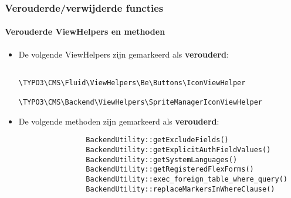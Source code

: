 \begin{frame}[fragile]
	\frametitle{Verouderde/verwijderde functies}
	\framesubtitle{Verouderde ViewHelpers en methoden}


	\begin{itemize}

		\item De volgende ViewHelpers zijn gemarkeerd als \textbf{verouderd}:

			\begin{lstlisting}
				\TYPO3\CMS\Fluid\ViewHelpers\Be\Buttons\IconViewHelper
				\TYPO3\CMS\Backend\ViewHelpers\SpriteManagerIconViewHelper
			\end{lstlisting}

		\item De volgende methoden zijn gemarkeerd als \textbf{verouderd}:

			\begin{lstlisting}
				BackendUtility::getExcludeFields()
				BackendUtility::getExplicitAuthFieldValues()
				BackendUtility::getSystemLanguages()
				BackendUtility::getRegisteredFlexForms()
				BackendUtility::exec_foreign_table_where_query()
				BackendUtility::replaceMarkersInWhereClause()
			\end{lstlisting}

	\end{itemize}

\end{frame}

